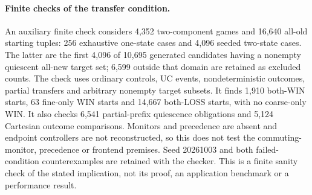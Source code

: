 \paragraph{Finite checks of the transfer condition.}
An auxiliary finite check considers 4,352 two-component games and 16,640 all-old starting tuples: 256 exhaustive one-state cases and 4,096 seeded two-state cases. The latter are the first 4,096 of 10,695 generated candidates having a nonempty quiescent all-new target set; 6,599 outside that domain are retained as excluded counts. The check uses ordinary controls, UC events, nondeterministic outcomes, partial transfers and arbitrary nonempty target subsets. It finds 1,910 both-WIN starts, 63 fine-only WIN starts and 14,667 both-LOSS starts, with no coarse-only WIN. It also checks 6,541 partial-prefix quiescence obligations and 5,124 Cartesian outcome comparisons. Monitors and precedence are absent and endpoint controllers are not reconstructed, so this does not test the commuting-monitor, precedence or frontend premises. Seed 20261003 and both failed-condition counterexamples are retained with the checker. This is a finite sanity check of the stated implication, not its proof, an application benchmark or a performance result.

